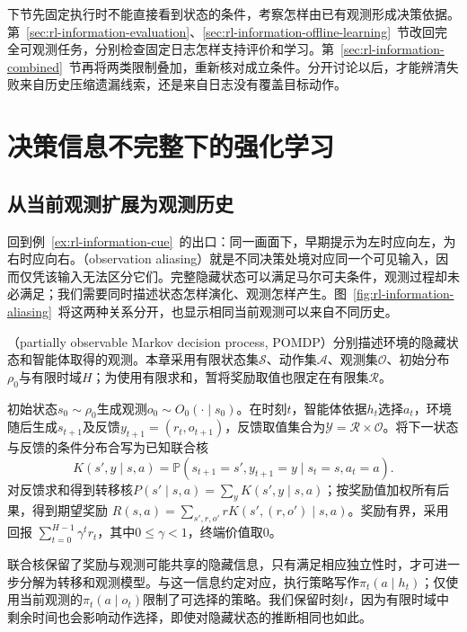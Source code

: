 下节先固定执行时不能直接看到状态的条件，考察怎样由已有观测形成决策依据。第~\ref{sec:rl-information-evaluation}、\ref{sec:rl-information-offline-learning}~节改回完全可观测任务，分别检查固定日志怎样支持评价和学习。第~\ref{sec:rl-information-combined}~节再将两类限制叠加，重新核对成立条件。分开讨论以后，才能辨清失败来自历史压缩遗漏线索，还是来自日志没有覆盖目标动作。

\section{决策信息不完整下的强化学习}
\label{sec:rl-information-partial-observation}

\subsection{从当前观测扩展为观测历史}
\label{sec:rl-information-history-policy}

回到例~\ref{ex:rl-information-cue}~的出口：同一画面下，早期提示为左时应向左，为右时应向右。（observation aliasing）就是不同决策处境对应同一个可见输入，因而仅凭该输入无法区分它们。完整隐藏状态可以满足马尔可夫条件，观测过程却未必满足；我们需要同时描述状态怎样演化、观测怎样产生。图~\ref{fig:rl-information-aliasing}~将这两种关系分开，也显示相同当前观测可以来自不同历史。

\begin{definition}[有限部分可观测马尔可夫决策过程]
  \label{def:rl-information-pomdp}
  （partially observable Markov decision process, POMDP）分别描述环境的隐藏状态和智能体取得的观测。本章采用有限状态集$\mathcal S$、动作集$\mathcal A$、观测集$\mathcal O$、初始分布$\rho_0$与有限时域$H$；为使用有限求和，暂将奖励取值也限定在有限集$\mathcal R$。

  初始状态$s_0\sim\rho_0$生成观测$o_0\sim O_0(\cdot\mid s_0)$。在时刻$t$，智能体依据$h_t$选择$a_t$，环境随后生成$s_{t+1}$及反馈$y_{t+1}=(r_t,o_{t+1})$，反馈取值集合为$\mathcal Y=\mathcal R\times\mathcal O$。将下一状态与反馈的条件分布合写为已知联合核
  \[
    K(s',y\mid s,a)
    =\mathbb P(s_{t+1}=s',y_{t+1}=y\mid s_t=s,a_t=a).
  \]
  对反馈求和得到转移核$P(s'\mid s,a)=\sum_yK(s',y\mid s,a)$；按奖励值加权所有后果，得到期望奖励
  $R(s,a)=\sum_{s',r,o'}rK(s',(r,o')\mid s,a)$。奖励有界，采用回报
  $\sum_{t=0}^{H-1}\gamma^t r_t$，其中$0\leq\gamma<1$，终端价值取0。
\end{definition}

联合核保留了奖励与观测可能共享的隐藏信息，只有满足相应独立性时，才可进一步分解为转移和观测模型。与这一信息约定对应，执行策略写作$\pi_t(a\mid h_t)$；仅使用当前观测的$\pi_t(a\mid o_t)$限制了可选择的策略。我们保留时刻$t$，因为有限时域中剩余时间也会影响动作选择，即使对隐藏状态的推断相同也如此。

